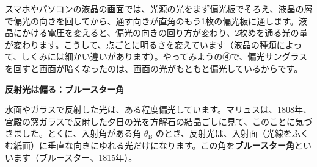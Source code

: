 \begin{phmijika}[液晶の画面]
スマホやパソコンの液晶の画面では、光源の光をまず偏光板でそろえ、液晶の層で偏光の向きを回してから、通す向きが直角のもう1枚の偏光板に通します。液晶にかける電圧を変えると、偏光の向きの回り方が変わり、2枚めを通る光の量が変わります。こうして、点ごとに明るさを変えています（液晶の種類によって、しくみには細かい違いがあります）。やってみようの④で、偏光サングラスを回すと画面が暗くなったのは、画面の光がもともと偏光しているからです。
\end{phmijika}

\noindent\textbf{反射光は偏る：ブルースター角}\par\nobreak
水面やガラスで反射した光は、ある程度偏光しています。マリュスは、1808年、宮殿の窓ガラスで反射した夕日の光を方解石の結晶ごしに見て、このことに気づきました。とくに、入射角がある角 $\theta_{\mathrm B}$ のとき、反射光は、入射面（光線をふくむ紙面）に垂直な向きにゆれる光だけになります。この角を\textbf{ブルースター角}といいます（ブルースター、1815年）。


